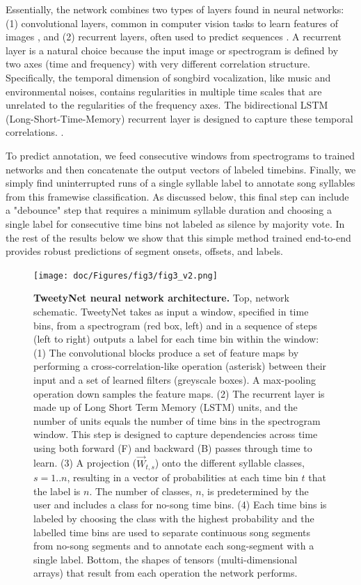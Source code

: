 \documentclass[10pt,letterpaper]{article}
\begin{document}
Essentially, the network combines two types of layers found in neural networks:(1) convolutional layers, common in computer vision tasks to learn features of images \cite{goodfellow_deep_2016,farabet_learning_2013,krizhevsky_imagenet_2012}, and (2) recurrent layers, often used to predict sequences \cite{graves_supervised_2012}. A recurrent layer is a natural choice because the input image or spectrogram is defined by two axes (time and frequency) with very different correlation structure.  Specifically, the temporal dimension of songbird vocalization, like music and environmental noises, contains regularities in multiple time scales that are unrelated to the regularities of the frequency axes. The bidirectional LSTM (Long-Short-Time-Memory) recurrent layer is designed to capture these temporal correlations. \cite{bock_polyphonic_2012-1,parascandolo_recurrent_2016}. 

To predict annotation, we feed consecutive windows from spectrograms to trained networks and
then concatenate the output vectors of labeled timebins. 
Finally, we simply find uninterrupted runs of a single syllable label to annotate song syllables from this framewise classification. As discussed below, this final step can include a "debounce" step that requires a minimum syllable duration and choosing a single label for consecutive time bins not labeled as silence by majority vote. In the rest of the results below we show that this simple method trained end-to-end 
provides robust predictions of segment onsets, offsets, and labels.


\begin{figure}[!h]
\texttt{[image: doc/Figures/fig3/fig3\_v2.png]}
\caption{{\bf TweetyNet neural network architecture.}
Top, network schematic. TweetyNet takes as input a window, 
specified in time bins, from a spectrogram (red box, left) 
and in a sequence of steps (left to right) outputs a label for each time bin within the window:
(1) The convolutional blocks produce a set of feature maps 
by performing a cross-correlation-like operation (asterisk) 
between their input and a set of learned filters (greyscale boxes). 
A max-pooling operation down samples the feature maps.
(2) The recurrent layer is made up of Long Short Term Memory (LSTM) units, 
and the number of units equals the number of time bins in the spectrogram window. 
This step is designed to capture dependencies across time 
using both forward (F) and backward (B) passes through time to learn. 
(3) A projection ($\overrightarrow{W}_{t,s}$) onto the different syllable classes, $s=1..n$, 
resulting in a vector of probabilities at each time bin $t$ that the label is $n$. 
The number of classes, $n$, is predetermined by the user and includes a class for no-song time bins.
(4) Each time bins is labeled by choosing the class with the highest probability 
and the labelled time bins are used to separate continuous song segments 
from no-song segments and to annotate each song-segment with a single label.
Bottom, the shapes of tensors (multi-dimensional arrays) that result from each operation the network performs.}
\label{fig3}
\end{figure}
\end{document}
